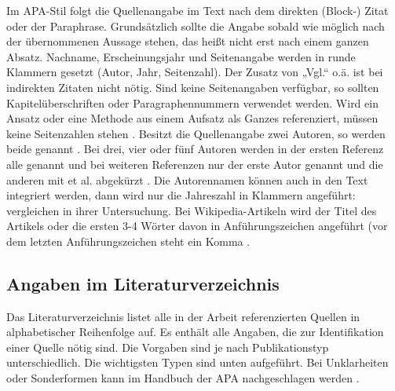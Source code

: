 Im APA-Stil folgt die Quellenangabe im Text nach dem direkten (Block-) Zitat oder der Paraphrase.
Grundsätzlich sollte die Angabe sobald wie möglich nach der übernommenen Aussage stehen, das heißt nicht erst nach einem ganzen Absatz.
Nachname, Erscheinungsjahr und Seitenangabe werden in runde Klammern gesetzt (Autor, Jahr, Seitenzahl).
Der Zusatz von „Vgl.“ o.ä. ist bei indirekten Zitaten nicht nötig.
Sind keine Seitenangaben verfügbar, so sollten Kapitelüberschriften oder Paragraphennummern verwendet werden.
Wird ein Ansatz oder eine Methode aus einem Aufsatz als Ganzes referenziert, müssen keine Seitenzahlen stehen \cite{mustermann2013test}.
Besitzt die Quellenangabe zwei Autoren, so werden beide genannt \cite{mustermann2015gemeinsam}.
Bei drei, vier oder fünf Autoren werden in der ersten Referenz alle genannt \cite*{mustermann2017viele} und bei weiteren Referenzen nur der erste Autor genannt und die anderen mit et al. abgekürzt \cite{mustermann2017viele}.
Die Autorennamen können auch in den Text integriert werden, dann wird nur die Jahreszahl in Klammern angeführt: \citet{mustermann2013test} vergleichen in ihrer Untersuchung.
Bei Wikipedia-Artikeln wird der Titel des Artikels oder die ersten 3-4 Wörter davon in Anführungszeichen angeführt (vor dem letzten Anführungszeichen steht ein Komma \cite{noauthor_wissenschaft_2020}.

\subsection{Angaben im Literaturverzeichnis}\label{subsubsec:angaben}

Das Literaturverzeichnis listet alle in der Arbeit referenzierten Quellen in alphabetischer Reihenfolge auf.
Es enthält alle Angaben, die zur Identifikation einer Quelle nötig sind.
Die Vorgaben sind je nach Publikationstyp unterschiedlich.
Die wichtigsten Typen sind unten aufgeführt.
Bei Unklarheiten oder Sonderformen kann im Handbuch der APA nachgeschlagen werden \cite{american2010concise}.


\makeatletter 
\renewcommand\BR@b@bibitem[2][]{\BR@bibitem[#1]{#2}\BR@c@bibitem{#2}}           
\makeatother

\nobibliography*%


